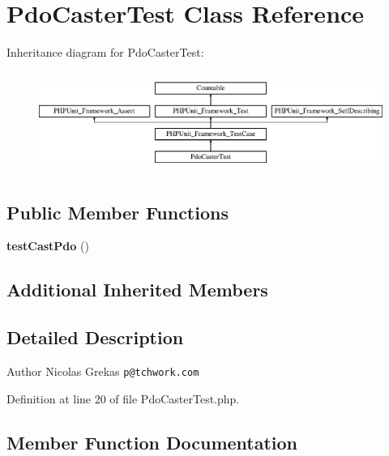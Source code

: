 \section{Pdo\+Caster\+Test Class Reference}
\label{class_symfony_1_1_component_1_1_var_dumper_1_1_tests_1_1_caster_1_1_pdo_caster_test}
Inheritance diagram for Pdo\+Caster\+Test\+:\begin{figure}[H]
\begin{center}
\leavevmode
\includegraphics[height=3.303835cm]{class_symfony_1_1_component_1_1_var_dumper_1_1_tests_1_1_caster_1_1_pdo_caster_test}
\end{center}
\end{figure}
\subsection*{Public Member Functions}
\begin{DoxyCompactItemize}
\item 
{\bf test\+Cast\+Pdo} ()
\end{DoxyCompactItemize}
\subsection*{Additional Inherited Members}


\subsection{Detailed Description}
\begin{DoxyAuthor}{Author}
Nicolas Grekas {\tt p@tchwork.\+com} 
\end{DoxyAuthor}


Definition at line 20 of file Pdo\+Caster\+Test.\+php.



\subsection{Member Function Documentation}
